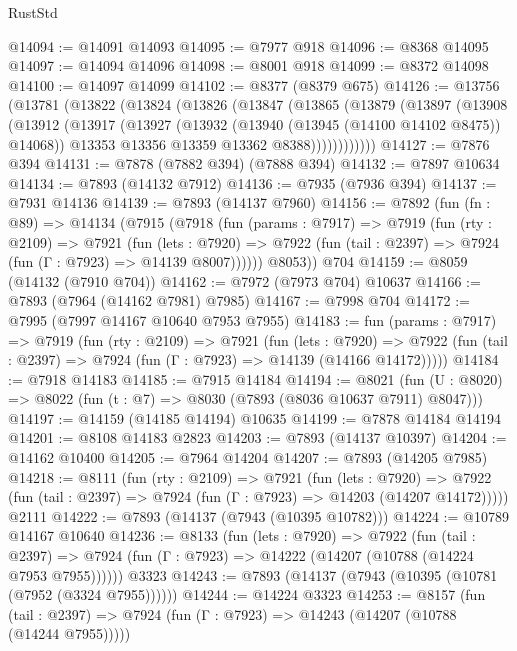 \begin{lexlean}{RustStd}
\begin{coremodule}
{\begin{coremodule}
{{{{{{{{{{{{{{{{{{{{{{{{{{{{{{{{{{{{{{{{{{{{{{{{{{@14094 := @14091 @14093
@14095 := @7977 @918
@14096 := @8368 @14095
@14097 := @14094 @14096
@14098 := @8001 @918
@14099 := @8372 @14098
@14100 := @14097 @14099
@14102 := @8377 (@8379 @675)
@14126 := @13756
    (@13781
      (@13822
        (@13824
          (@13826
            (@13847
              (@13865
                (@13879
                  (@13897
                    (@13908
                      (@13912
                        (@13917
                          (@13927
                            (@13932 (@13940 (@13945 (@14100 @14102 @8475)) @14068))
                            @13353
                            @13356
                            @13359
                            @13362
                            @8388))))))))))))
@14127 := @7876 @394
@14131 := @7878 (@7882 @394) (@7888 @394)
@14132 := @7897 @10634
@14134 := @7893 (@14132 @7912)
@14136 := @7935 (@7936 @394)
@14137 := @7931 @14136
@14139 := @7893 (@14137 @7960)
@14156 := @7892
    (fun (fn : @89) =>
    @14134
      (@7915
        (@7918
          (fun (params : @7917) =>
          @7919
            (fun (rty : @2109) =>
            @7921
              (fun (lets : @7920) =>
              @7922 (fun (tail : @2397) => @7924 (fun (Γ : @7923) => @14139 @8007))))))
        @8053))
    @704
@14159 := @8059 (@14132 (@7910 @704))
@14162 := @7972 (@7973 @704) @10637
@14166 := @7893 (@7964 (@14162 @7981) @7985)
@14167 := @7998 @704
@14172 := @7995 (@7997 @14167 @10640 @7953 @7955)
@14183 := fun (params : @7917) =>
  @7919
    (fun (rty : @2109) =>
    @7921
      (fun (lets : @7920) =>
      @7922 (fun (tail : @2397) => @7924 (fun (Γ : @7923) => @14139 (@14166 @14172)))))
@14184 := @7918 @14183
@14185 := @7915 @14184
@14194 := @8021
    (fun (U : @8020) => @8022 (fun (t : @7) => @8030 (@7893 (@8036 @10637 @7911) @8047)))
@14197 := @14159 (@14185 @14194) @10635
@14199 := @7878 @14184 @14194
@14201 := @8108 @14183 @2823
@14203 := @7893 (@14137 @10397)
@14204 := @14162 @10400
@14205 := @7964 @14204
@14207 := @7893 (@14205 @7985)
@14218 := @8111
    (fun (rty : @2109) =>
    @7921
      (fun (lets : @7920) =>
      @7922 (fun (tail : @2397) => @7924 (fun (Γ : @7923) => @14203 (@14207 @14172)))))
    @2111
@14222 := @7893 (@14137 (@7943 (@10395 @10782)))
@14224 := @10789 @14167 @10640
@14236 := @8133
    (fun (lets : @7920) =>
    @7922
      (fun (tail : @2397) =>
      @7924 (fun (Γ : @7923) => @14222 (@14207 (@10788 (@14224 @7953 @7955))))))
    @3323
@14243 := @7893 (@14137 (@7943 (@10395 (@10781 (@7952 (@3324 @7955))))))
@14244 := @14224 @3323
@14253 := @8157
    (fun (tail : @2397) => @7924 (fun (Γ : @7923) => @14243 (@14207 (@10788 (@14244 @7955)))))
}}}}}}}}}}}}}}}}}}}}}}}}}}}}}}}}}}}}}}}}}}}}}}}}}}
\end{coremodule}}
\end{coremodule}
\end{lexlean}
